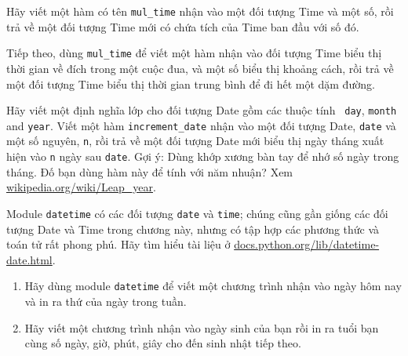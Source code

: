 \documentclass[11pt]{book}
\begin{document}
\begin{ex}
Hãy viết một hàm có tên \verb"mul_time" nhận vào một đối tượng Time
và một số, rồi trả về một đối tượng Time mới có chứa tích của Time
ban đầu với số đó.

Tiếp theo, dùng \verb"mul_time" để viết một hàm nhận vào đối tượng Time
biểu thị thời gian về đích trong một cuộc đua, và một số biểu thị
khoảng cách, rồi trả về một đối tượng Time biểu thị thời gian trung bình
để đi hết một dặm đường.


\end{ex}

\begin{ex}


Hãy viết một định nghĩa lớp cho đối tượng Date gồm các thuộc tính  {\tt
  day}, {\tt month} and {\tt year}.  Viết một hàm 
\verb"increment_date" nhận vào một đối tượng Date, {\tt date} và một
số nguyên, {\tt n}, rồi trả về một đối tượng Date mới biểu thị
ngày tháng xuất hiện vào {\tt n} ngày sau {\tt date}.  Gợi ý: Dùng khớp xương
bàn tay để nhớ số ngày trong tháng. Đố bạn dùng hàm này để tính
với năm nhuận? Xem \url{wikipedia.org/wiki/Leap_year}.

\end{ex}


\begin{ex}


Module {\tt datetime} có các đối tượng {\tt date} và {\tt time}; chúng cũng
gần giống các đối tượng Date và Time trong chương này, nhưng có
tập hợp các phương thức và toán tử rất phong phú. Hãy tìm hiểu 
tài liệu ở \url{docs.python.org/lib/datetime-date.html}.

\begin{enumerate}

\item Hãy dùng module {\tt datetime} để viết một chương trình nhận vào
ngày hôm nay và in ra thứ của ngày trong tuần.


\item Hãy viết một chương trình nhận vào ngày sinh của bạn rồi in ra tuổi 
bạn cùng số ngày, giờ, phút, giây cho đến sinh nhật tiếp theo.
\end{enumerate}

\end{ex}
\end{document}
